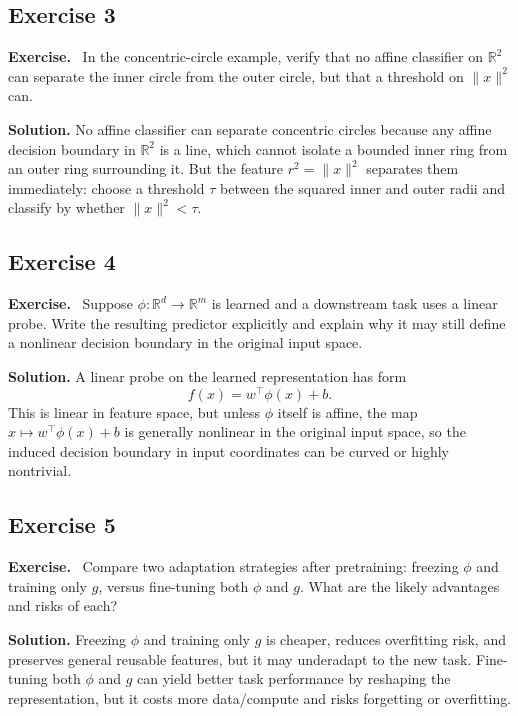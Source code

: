 \documentclass[11pt]{article}
\newenvironment{exercisebox}{\begin{framed}\noindent\textbf{Exercise.}\ }{\end{framed}}
\begin{document}
\subsection*{Exercise 3}
\begin{exercisebox}
In the concentric-circle example, verify that no affine classifier on \(\mathbb{R}^2\) can separate the inner circle from the outer circle, but that a threshold on \(\|x\|^2\) can.
\end{exercisebox}
\textbf{Solution.} No affine classifier can separate concentric circles because any affine decision boundary in $\mathbb R^2$ is a line, which cannot isolate a bounded inner ring from an outer ring surrounding it. But the feature $r^2=\|x\|^2$ separates them immediately: choose a threshold $\tau$ between the squared inner and outer radii and classify by whether $\|x\|^2<\tau$.

\subsection*{Exercise 4}
\begin{exercisebox}
Suppose \(\phi : \mathbb{R}^d \to \mathbb{R}^m\) is learned and a downstream task uses a linear probe.
    Write the resulting predictor explicitly and explain why it may still define a nonlinear decision boundary in the original input space.
\end{exercisebox}
\textbf{Solution.} A linear probe on the learned representation has form
\[
f(x)=w^\top\phi(x)+b.
\]
This is linear in feature space, but unless $\phi$ itself is affine, the map $x\mapsto w^\top\phi(x)+b$ is generally nonlinear in the original input space, so the induced decision boundary in input coordinates can be curved or highly nontrivial.

\subsection*{Exercise 5}
\begin{exercisebox}
Compare two adaptation strategies after pretraining: freezing \(\phi\) and training only \(g\), versus fine-tuning both \(\phi\) and \(g\).
    What are the likely advantages and risks of each?
\end{exercisebox}
\textbf{Solution.} Freezing $\phi$ and training only $g$ is cheaper, reduces overfitting risk, and preserves general reusable features, but it may underadapt to the new task. Fine-tuning both $\phi$ and $g$ can yield better task performance by reshaping the representation, but it costs more data/compute and risks forgetting or overfitting.
\end{document}
